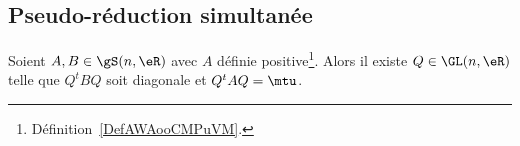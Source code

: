 \subsection{Pseudo-réduction simultanée}

\begin{corollary}  \label{CorNHKnLVA}
	Soient \( A,B\in \gS(n,\eR)\) avec \( A\) définie positive\footnote{Définition~\ref{DefAWAooCMPuVM}.}. Alors il existe \( Q\in \GL(n,\eR)\) telle que \( Q^tBQ\) soit diagonale et \( Q^tAQ=\mtu\).
\end{corollary}

